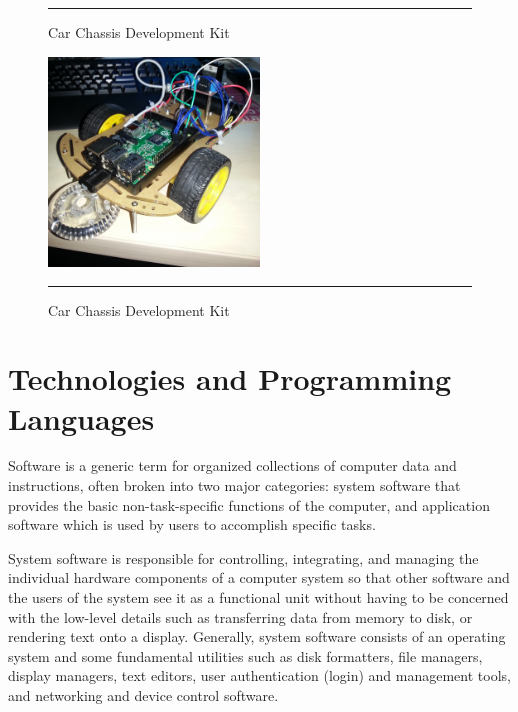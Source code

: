 \begin{figure}[h!]
\begin{subfigure}[b]{0.5\textwidth}
        \end{subfigure}
        \rule{1\textwidth}{1pt}
        \caption{Car Chassis Development Kit}
        \label{fig:car_chassis}
\end{figure}
\begin{figure}[h!]
        \centering
        \includegraphics[width=0.5\textwidth]{./Pictures/Car-Chassis-Kit3.jpg}
		\rule{0.5\textwidth}{1pt}
        \caption{Car Chassis Development Kit}
\end{figure}
\clearpage
\section{Technologies and Programming Languages}

Software is a generic term for organized collections of computer data and instructions, often broken into two major categories: system software that provides the basic non-task-specific functions of the computer, and application software which is used by users to accomplish specific tasks.

System software is responsible for controlling, integrating, and managing the individual hardware components of a computer system so that other software and the users of the system see it as a functional unit without having to be concerned with the low-level details such as transferring data from memory to disk, or rendering text onto a display. Generally, system software consists of an operating system and some fundamental utilities such as disk formatters, file managers, display managers, text editors, user authentication (login) and management tools, and networking and device control software.

